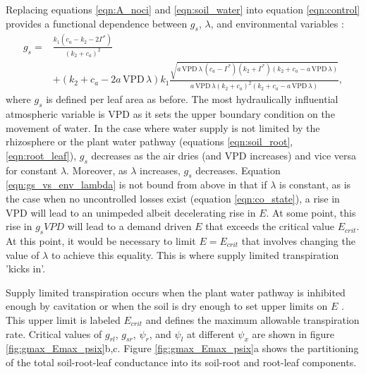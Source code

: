 \documentclass[utf8]{frontiersSCNS} %
\begin{document}
Replacing equations \ref{eqn:A_noci} and \ref{eqn:soil_water} into equation \ref{eqn:control} provides a functional dependence between $g_s$, $\lambda$, and environmental variables \citep{katul_stomatal_2009}:
\begin{equation}
    \label{eqn:gs_vs_env_lambda}
    \begin{split}
        g_s = & \frac{k_1 (c_a - k_2 - 2 \Gamma^*)}{(k_2+c_a)^2} \\
        & + (k_2+c_a-2 a\, \text{VPD}\, \lambda) k_1 \frac{\sqrt{a\, \text{VPD}\, \lambda\, (c_a-\Gamma^*)(k_2+\Gamma^*)(k_2+c_a-a\, \text{VPD}\, \lambda)}}{a\, \text{VPD}\, \lambda (k_2 +c_a)^2(k_2 +c_a-a\, \text{VPD}\, \lambda)} ,
    \end{split}
\end{equation}
where $g_s$ is defined per leaf area as before. The most hydraulically influential atmospheric variable is VPD as it sets the upper boundary condition on the movement of water. In the case where water supply is not limited by the rhizosphere or the plant water pathway (equations \ref{eqn:soil_root}, \ref{eqn:root_leaf}), $g_s$ decreases as the air dries (and VPD increases) and vice versa for constant $\lambda$. Moreover, as $\lambda$ increases, $g_s$ decreases. Equation \ref{eqn:gs_vs_env_lambda} is not bound from above in that if $\lambda$ is constant, as is the case when no uncontrolled losses exist (equation \ref{eqn:co_state}), a rise in VPD will lead to an unimpeded albeit decelerating rise in $E$. At some point, this rise in $g_s VPD$ will lead to a demand driven $E$ that exceeds the critical value $E_{crit}$. At this point, it would be necessary to limit $E = E_{crit}$ that involves changing the value of $\lambda$ to achieve this equality. This is where supply limited transpiration 'kicks in'.

Supply limited transpiration occurs when the plant water pathway is inhibited enough by cavitation or when the soil is dry enough to set upper limits on $E$ \citep{west_transpiration_2008}. This upper limit is labeled $E_{crit}$ and defines the maximum allowable transpiration rate. Critical values of $g_{rl}$, $g_{sr}$, $\psi_r$, and $\psi_l$ at different $\psi_x$ are shown in figure \ref{fig:gmax_Emax_psix}b,c. Figure \ref{fig:gmax_Emax_psix}a shows the partitioning of the total soil-root-leaf conductance into its soil-root and root-leaf components. 
\end{document}

